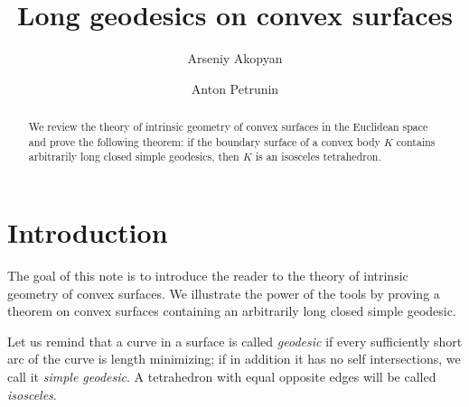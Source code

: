 \documentclass[oneside,a4paper, 12pt]{article}
\begin{document}
\title{Long geodesics on convex surfaces}
\author{Arseniy Akopyan
\and 
Anton Petrunin}
\newcommand{\Addresses}{{\bigskip\footnotesize

Arseniy Akopyan, 
\par\nopagebreak\textsc{Institute of Science and Technology Austria,} 
\par\nopagebreak\textsc{Am Campus 1, 3400 Klosterneuburg, Austria.}
\par\nopagebreak\textit{Email}: \texttt{akopjan@gmail.com}

\medskip

Anton Petrunin, 
\par\nopagebreak\textsc{Mathematics Department,} 
\par\nopagebreak\textsc{Pennsylvania State University,}
\par\nopagebreak\textsc{University Park, PA 16802, USA}
  \par\nopagebreak
  \textit{Email}: \texttt{petrunin@math.psu.edu}
}}
\date{}
\maketitle

\begin{abstract}
We review the theory of intrinsic geometry of convex surfaces in the Euclidean space and prove the following theorem: 
if the boundary surface of a convex body $K$ contains arbitrarily long closed simple geo\-de\-sics, then $K$ is an isosceles tetrahedron.
\end{abstract}


\section{Introduction}
The goal of this note is to introduce the reader to the theory of intrinsic geometry of convex surfaces.
We illustrate the power of the tools by proving a theorem on convex surfaces containing an arbitrarily long closed simple geodesic. 

Let us remind that a curve in a surface is called \emph{geodesic} if every sufficiently short arc of the curve is length minimizing; if in addition it has no self intersections, we call it \emph{simple geodesic}.
A tetrahedron with equal opposite edges will be called \emph{isosceles}.
\end{document}
